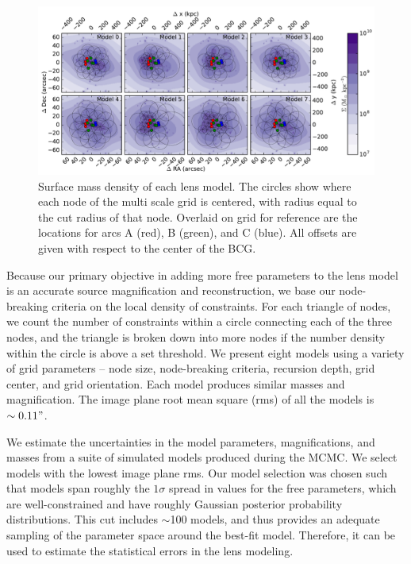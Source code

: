 \begin{figure}
\center
\includegraphics[width=\textwidth]{Chap4/c4f6.pdf}
\caption[Surface mass density of \cluster\ lens model]{Surface mass density of each lens model. The circles show where each node of the multi scale grid is centered, with radius equal to the cut radius of that node. Overlaid on grid for reference are the locations for arcs A (red), B (green), and C (blue). All offsets are given with respect to the center of the BCG.}
\label{chap4:fig:mass_distribution}
\end{figure}

Because our primary objective in adding more free parameters to the lens model is an accurate source magnification and reconstruction, we base our node-breaking criteria on the local density of constraints. For each triangle of nodes, we count the number of constraints within a circle connecting each of the three nodes, and the triangle is broken down into more nodes if the number density within the circle is above a set threshold. We present eight models using a variety of grid parameters -- node size, node-breaking criteria, recursion depth, grid center, and grid orientation. Each model produces similar masses and magnification. The image plane root mean square (rms) of all the models is $\sim0.11"$.

We estimate the uncertainties in the model parameters, magnifications, and masses from a suite of simulated models produced during the MCMC. We select models with the lowest image plane rms. Our model selection was chosen such that models span roughly the $1\sigma$ spread in values for the free parameters, which are well-constrained and have roughly Gaussian posterior probability distributions. This cut includes $\sim$100 models, and thus provides an adequate sampling of the parameter space around the best-fit model. Therefore, it can be used to estimate the statistical errors in the lens modeling.

